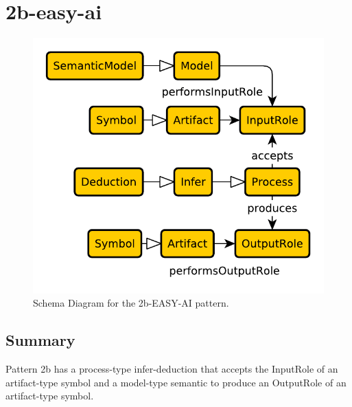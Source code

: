 \section{2b-easy-ai}
\label{sec:2b}
\begin{figure}[h!]
\begin{center}
\includegraphics[width=.8\textwidth]{images/schema-diagrams/2b-elementary-pattern.pdf}
\end{center}
\caption{Schema Diagram for the 2b-EASY-AI pattern. %
}
\label{fig:2b}
\end{figure}
\subsection{Summary}
Pattern 2b has a process-type infer-deduction that accepts the InputRole of an artifact-type symbol and a model-type semantic to produce an OutputRole of an artifact-type symbol.
\label{sum:2b}
